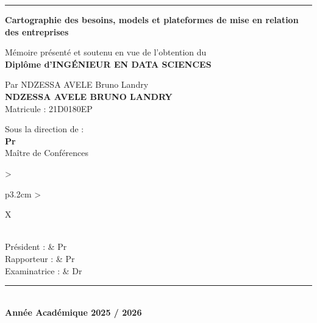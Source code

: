 \documentclass[12pt, a4paper, oneside]{report}
\newcommand{\auteur}{NDZESSA AVELE BRUNO LANDRY}
\newcommand{\matricule}{21D0180EP}
\newcommand{\directeur}{Pr }
\newcommand{\annee}{2025 / 2026}
\newcommand{\titredoc}{Cartographie des besoins, models et plateformes de mise en relation des entreprises}
\begin{document}
\begin{titlepage}
\begin{center}
			\vspace{0.15cm}
			\textcolor{primary}{\rule{\linewidth}{1.5pt}}
			\vspace{0.5cm}
			
			\begin{tcolorbox}[
				colback=primary!6, colframe=primary,
				arc=5pt, boxrule=1pt,
				left=12pt, right=12pt, top=10pt, bottom=10pt
				]
				\centering
				{\large\bfseries\color{primary} \titredoc}
			\end{tcolorbox}
			
			\vspace{0.45cm}
			
			{\normalsize Mémoire présenté et soutenu en vue de l'obtention du}\\[5pt]
			{\large\bfseries\color{primary} Diplôme d'INGÉNIEUR EN DATA SCIENCES}
			
			\vspace{0.45cm}
			
			{\normalsize Par NDZESSA AVELE Bruno Landry}\\[5pt]
			{\large\bfseries \auteur}\\[3pt]
			{\small Matricule : \matricule}
			
			\vspace{0.4cm}
			
			{\normalsize Sous la direction de :}\\[5pt]
			{\large\bfseries\color{primary} \directeur}\\[2pt]
			{\small Maître de Conférences}
			
			\vspace{0.4cm}
			
			\begin{tabularx}{\textwidth}{>{\bfseries\raggedright\arraybackslash}p{3.2cm}
					>{\raggedright\arraybackslash}X}
				\\[6pt]
				Président :    & Pr  \\[4pt]
				Rapporteur :   & Pr  \\[4pt]
				Examinatrice : & Dr  \\
			\end{tabularx}
			
			\vfill
			
			\textcolor{primary}{\rule{\linewidth}{1pt}}\\[5pt]
			{\bfseries Année Académique \annee}
			
		\end{center}
		\restoregeometry
	\end{titlepage}
	
\end{document}
